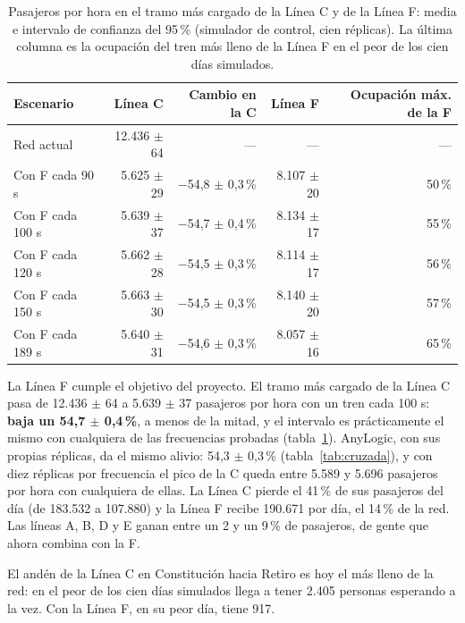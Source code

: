 \documentclass{article}
\begin{document}
\begin{table}[htbp]
  \centering\small
  \caption{Pasajeros por hora en el tramo más cargado de la Línea C y de la Línea F: media e intervalo de
  confianza del 95\,\% (simulador de control, cien réplicas). La última columna es la ocupación del tren más
  lleno de la Línea F en el peor de los cien días simulados.}
  \label{tab:picos}
  \begin{tabular}{lrrrr}
    \toprule
    Escenario & Línea C & Cambio en la C & Línea F & Ocupación máx. de la F \\
    \midrule
    Red actual   & 12.436 $\pm$ 64 & ---         & ---   & ---    \\
    Con F cada 90 s  & 5.625 $\pm$ 29  & $-$54,8 $\pm$ 0,3\,\% & 8.107 $\pm$ 20 & 50\,\% \\
    Con F cada 100 s & 5.639 $\pm$ 37  & $-$54,7 $\pm$ 0,4\,\% & 8.134 $\pm$ 17 & 55\,\% \\
    Con F cada 120 s & 5.662 $\pm$ 28  & $-$54,5 $\pm$ 0,3\,\% & 8.114 $\pm$ 17 & 56\,\% \\
    Con F cada 150 s & 5.663 $\pm$ 30  & $-$54,5 $\pm$ 0,3\,\% & 8.140 $\pm$ 20 & 57\,\% \\
    Con F cada 189 s & 5.640 $\pm$ 31  & $-$54,6 $\pm$ 0,3\,\% & 8.057 $\pm$ 16 & 65\,\% \\
    \bottomrule
  \end{tabular}
\end{table}

La Línea F cumple el objetivo del proyecto. El tramo más cargado de la Línea C pasa de 12.436 $\pm$ 64 a
5.639 $\pm$ 37 pasajeros por hora con un tren cada 100 s: \textbf{baja un 54,7 $\pm$ 0,4\,\%}, a menos de la
mitad, y el intervalo es prácticamente el mismo con cualquiera de las frecuencias probadas
(tabla~\ref{tab:picos}). AnyLogic, con sus propias réplicas, da el mismo alivio: 54,3 $\pm$ 0,3\,\%
(tabla~\ref{tab:cruzada}), y con diez réplicas por frecuencia el pico de la C queda entre 5.589 y 5.696
pasajeros por hora con cualquiera de ellas. La Línea C pierde el 41\,\% de sus pasajeros del día (de 183.532 a 107.880) y la
Línea F recibe 190.671 por día, el 14\,\% de la red. Las líneas A, B, D y E ganan entre un 2 y un 9\,\% de
pasajeros, de gente que ahora combina con la F.

El andén de la Línea C en Constitución hacia Retiro es hoy el más lleno de la red: en el peor de los cien días
simulados llega a tener 2.405 personas esperando a la vez. Con la Línea F, en su peor día, tiene 917.
\end{document}
